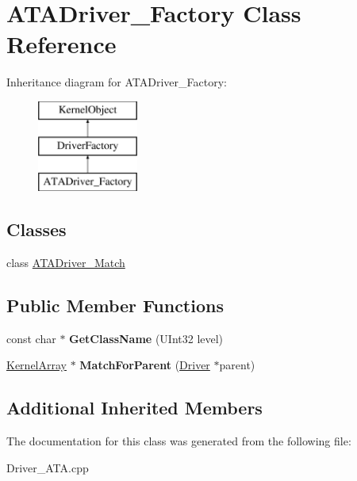 \hypertarget{class_a_t_a_driver___factory}{}\section{A\+T\+A\+Driver\+\_\+\+Factory Class Reference}
\label{class_a_t_a_driver___factory}
Inheritance diagram for A\+T\+A\+Driver\+\_\+\+Factory\+:\begin{figure}[H]
\begin{center}
\leavevmode
\includegraphics[height=3.000000cm]{class_a_t_a_driver___factory}
\end{center}
\end{figure}
\subsection*{Classes}
\begin{DoxyCompactItemize}
\item 
class \hyperlink{class_a_t_a_driver___factory_1_1_a_t_a_driver___match}{A\+T\+A\+Driver\+\_\+\+Match}
\end{DoxyCompactItemize}
\subsection*{Public Member Functions}
\begin{DoxyCompactItemize}
\item 
\mbox{\label{class_a_t_a_driver___factory_ab6565ae7815e3c67d22f04b3a35edc5c}} 
const char $\ast$ {\bfseries Get\+Class\+Name} (U\+Int32 level)
\item 
\mbox{\label{class_a_t_a_driver___factory_a1387aaec1518a594f1eaa3530518444a}} 
\hyperlink{class_kernel_array}{Kernel\+Array} $\ast$ {\bfseries Match\+For\+Parent} (\hyperlink{class_driver}{Driver} $\ast$parent)
\end{DoxyCompactItemize}
\subsection*{Additional Inherited Members}


The documentation for this class was generated from the following file\+:\begin{DoxyCompactItemize}
\item 
Driver\+\_\+\+A\+T\+A.\+cpp\end{DoxyCompactItemize}

